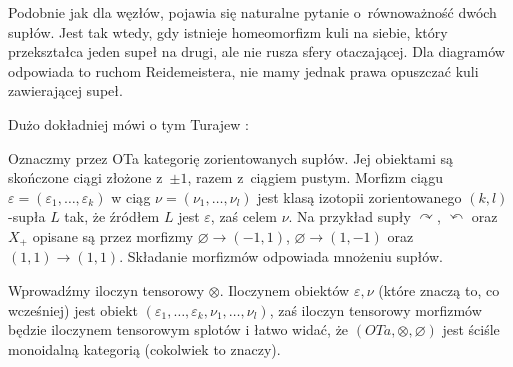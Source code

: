 Podobnie jak dla węzłów, pojawia się naturalne pytanie o~równoważność dwóch supłów.
Jest tak wtedy, gdy istnieje homeomorfizm kuli na siebie, który przekształca jeden supeł na drugi, ale nie rusza sfery otaczającej.
Dla diagramów odpowiada to ruchom Reidemeistera, nie mamy jednak prawa opuszczać kuli zawierającej supeł.

Dużo dokładniej mówi o tym Turajew \cite{turaev1990}:
%

\begin{proposition}
    Oznaczmy przez OTa kategorię zorientowanych supłów.
    Jej obiektami są skończone ciągi złożone z~$\pm 1$, razem z~ciągiem pustym.
    Morfizm ciągu $\varepsilon = (\varepsilon_1, \ldots, \varepsilon_k)$ w ciąg $\nu = (\nu_1, \ldots, \nu_l)$ jest klasą izotopii zorientowanego $(k, l)$-supła $L$ tak, że źródłem $L$ jest $\varepsilon$, zaś celem $\nu$.
    Na przykład supły $\curvearrowright$, $\curvearrowleft$ oraz $X_+$ opisane są przez morfizmy $\varnothing \to (-1, 1)$, $\varnothing \to (1, -1)$ oraz $(1, 1) \to (1, 1)$.
    Składanie morfizmów odpowiada mnożeniu supłów.

    Wprowadźmy iloczyn tensorowy $\otimes$.
    Iloczynem obiektów $\varepsilon, \nu$ (które znaczą to, co wcześniej) jest obiekt $(\varepsilon_1, \ldots, \varepsilon_k, \nu_1, \ldots, \nu_l)$, zaś iloczyn tensorowy morfizmów będzie iloczynem tensorowym splotów i łatwo widać, że $(OTa, \otimes, \varnothing)$ jest ściśle monoidalną kategorią (cokolwiek to znaczy).


\end{proposition}
